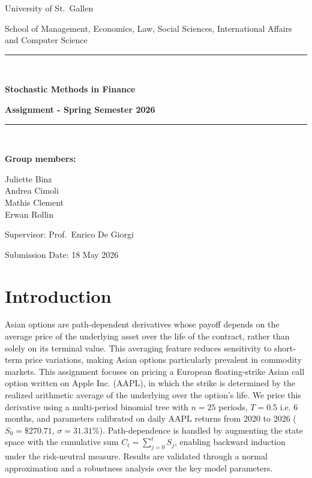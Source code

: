 \documentclass[hidelinks, 12pt, a4paper]{article}
\theoremstyle{definition}
\begin{document}
\begin{titlepage}
  \centering
  \vspace*{2cm}
  {\LARGE University of St.~Gallen \par}
  \vspace{0.5cm}
  {\large School of Management, Economics, Law, Social Sciences, International Affairs and Computer Science  \par}
  \vspace{1.5cm}
  \rule{\linewidth}{0.5pt}\\[0.4cm]
  {\LARGE \textbf{Stochastic Methods in Finance} \par}
  \vspace{0.3cm}
  {\Large \textbf{Assignment - Spring Semester 2026} \par}
  \rule{\linewidth}{0.5pt}\\[1.5cm]

  {\large \textbf{Group members:} \par}
  \vspace{0.5cm}
  Juliette Binz \\[0.3cm]
  Andrea Cimoli \\[0.3cm]
  Mathis Clement \\[0.3cm]
  Erwan Rollin

  \vfill
  {\large Supervisor: Prof.~Enrico De Giorgi \par}
  \vspace{0.3cm}
  {\large Submission Date: 18 May 2026 \par}
\end{titlepage}

\tableofcontents
\newpage
\listoffigures
\newpage
\listoftables
\newpage

\section{Introduction}
\label{sec:intro}

Asian options are path-dependent derivatives whose payoff depends on the average
price of the underlying asset over the life of the contract, rather than solely on
its terminal value. This averaging feature reduces sensitivity to short-term price
variations, making Asian options particularly prevalent in
commodity markets. This assignment focuses on pricing a European floating-strike Asian call option
written on Apple Inc. (AAPL), in which the strike is determined by the
realized arithmetic average of the underlying over the option's life.
We price this derivative using a multi-period binomial tree with $n = 25$ periods,
$T = 0.5$ i.e. 6 months, and parameters calibrated on daily AAPL returns from 2020 to 2026
($S_0 = \$270.71$, $\sigma = 31.31\%$). Path-dependence is handled by augmenting
the state space with the cumulative sum $C_t = \sum_{j=0}^{t} S_j$, enabling
backward induction under the risk-neutral measure. Results are validated through a
normal approximation and a robustness analysis over the key model parameters.
\end{document}
